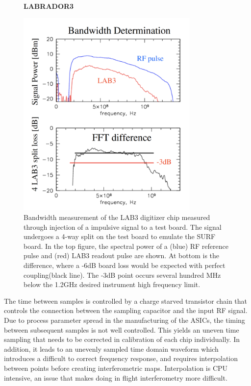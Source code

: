 \begin{figure}
\centering
    \textbf{LABRADOR3}\par\medskip
	\includegraphics[width=0.8\textwidth]{figures/LAB3B_bandwidth}
	\caption{Bandwidth measurement of the LAB3 digitizer chip measured through injection of a impulsive signal to a test board.  The signal undergoes a 4-way split on the test board to emulate the SURF board.  In the top figure, the spectral power of a (blue) RF reference pulse and (red) LAB3 readout pulse are shown. At bottom is the difference, where a -6dB board loss would be expected with perfect coupling(black line). The -3dB point occurs several hundred MHz below the 1.2GHz desired instrument high frequency limit.\cite{LABASICPAPER}  }
	\label{fig:LAB3B_bandwidth}
\end{figure}
	
	The time between samples is controlled by a charge starved transistor chain that controls the connection between the sampling capacitor and the input RF signal.  Due to process parameter spread in the manufacturing of the ASICs, the timing between subsequent samples is not well controlled.  This yields an uneven time sampling that needs to be corrected in calibration of each chip individually.  In addition, it leads to an unevenly sampled time domain waveform which introduces a difficult to correct frequency response, and requires interpolation between points before creating interferometric maps.  Interpolation is CPU intensive, an issue that makes doing in flight interferometry more difficult.
	
